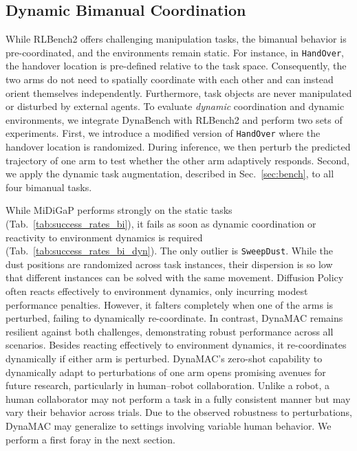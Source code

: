 \documentclass[letterpaper, 10 pt, journal, twoside]{IEEEtran}
\renewcommand{\secref}[1]{Sec.~\ref{#1}}
\newcommand{\tabref}[1]{Tab.~\ref{#1}}
\newcommand{\ourmethod}{DynaMAC\xspace}
\newcommand{\ourbench}{DynaBench\xspace}
\begin{document}
\subsection{Dynamic Bimanual Coordination}\label{sec:exp_bi_dyna}
%
While RLBench2 offers challenging manipulation tasks, the bimanual behavior is pre-coordinated, and the environments remain static.
For instance, in \texttt{HandOver}, the handover location is pre-defined relative to the task space.
Consequently, the two arms do not need to spatially coordinate with each other and can instead orient themselves independently.
Furthermore, task objects are never manipulated or disturbed by external agents.
To evaluate \emph{dynamic} coordination and dynamic environments, we integrate \ourbench{} with RLBench2 and perform two sets of experiments.
First, we introduce a modified version of \texttt{HandOver} where the handover location is randomized.
%
%
During inference, we then perturb the predicted trajectory of one arm to test whether the other arm adaptively responds.
Second, we apply the dynamic task augmentation, described in \secref{sec:bench}, to all four bimanual tasks.

While MiDiGaP performs strongly on the static tasks (\tabref{tab:success_rates_bi}), it fails as soon as dynamic coordination or reactivity to environment dynamics is required (\tabref{tab:success_rates_bi_dyn}).
The only outlier is \texttt{SweepDust}. While the dust positions are randomized across task instances, their dispersion is so low that different instances can be solved with the same movement.
Diffusion Policy often reacts effectively to environment dynamics, only incurring modest performance penalties.
However, it falters completely when one of the arms is perturbed, failing to dynamically re-coordinate.
In contrast, \ourmethod{} remains resilient against both challenges, demonstrating robust performance across all scenarios.
Besides reacting effectively to environment dynamics, it re-coordinates dynamically if either arm is perturbed. 
\ourmethod{}'s zero-shot capability to dynamically adapt to perturbations of one arm opens promising avenues for future research, particularly in human–robot collaboration. 
Unlike a robot, a human collaborator may not perform a task in a fully consistent manner but may vary their behavior across trials.
%
%
Due to the observed robustness to perturbations, \ourmethod{} may generalize to settings involving variable human behavior.
We perform a first foray in the next section.
\end{document}
